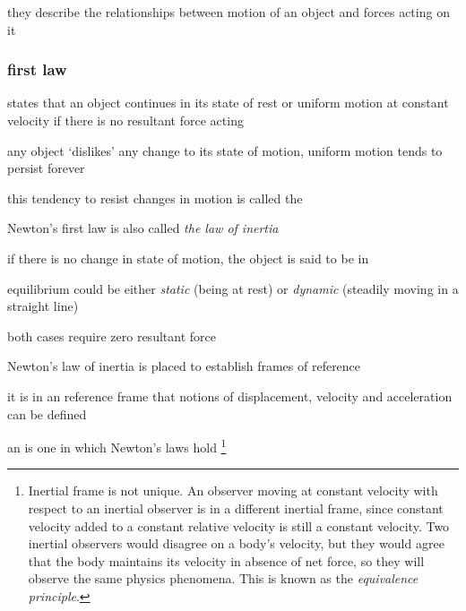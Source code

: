 they describe the relationships between motion of an object and forces acting on it


\subsubsection{first law}

\begin{ilight}
	 states that an object continues in its state of rest or uniform motion at constant velocity if there is no resultant force acting
\end{ilight}


\cmt any object `dislikes' any change to its state of motion, uniform motion tends to persist forever

this tendency to resist changes in motion is called the 

Newton's first law is also called \emph{the law of inertia}

\cmt if there is no change in state of motion, the object is said to be in 

equilibrium could be either \emph{static} (being at rest) or \emph{dynamic} (steadily moving in a straight line)

both cases require zero resultant force

\cmt Newton’s law of inertia is placed to establish frames of reference

it is in an reference frame that notions of displacement, velocity and acceleration can be defined

an  is one in which Newton’s laws hold
\footnote{Inertial frame is not unique. An observer moving at constant velocity with respect to an inertial observer is in a different inertial frame, since constant velocity added to a constant relative velocity is still a constant velocity. Two inertial observers would disagree on a body's velocity, but they would agree that the body maintains its velocity in absence of net force, so they will observe the same physics phenomena. This is known as the \emph{equivalence principle}.}

%	


